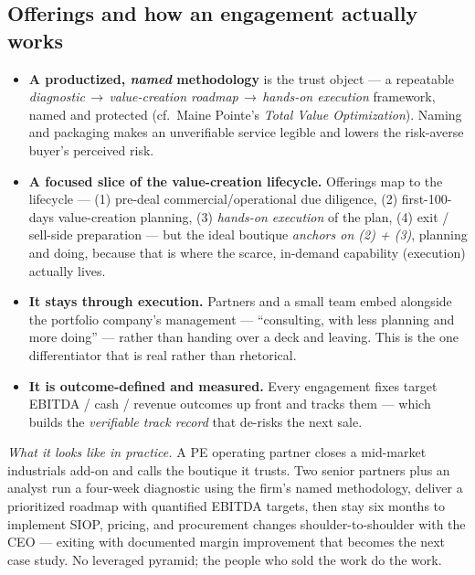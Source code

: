 \documentclass[11pt]{article}
\begin{document}
\subsection{Offerings and how an engagement actually works}
\begin{itemize}
  \item \textbf{A productized, \emph{named} methodology} is the trust object --- a
  repeatable \emph{diagnostic\,$\to$\,value-creation roadmap\,$\to$\,hands-on execution}
  framework, named and protected (cf.\ Maine Pointe's \emph{Total Value
  Optimization\texttrademark{}}). Naming and packaging makes an unverifiable service legible
  and lowers the risk-averse buyer's perceived risk.
  \item \textbf{A focused slice of the value-creation lifecycle.} Offerings map to the
  lifecycle --- (1) pre-deal commercial/operational due diligence, (2) first-100-days
  value-creation planning, (3) \emph{hands-on execution} of the plan, (4) exit / sell-side
  preparation --- but the ideal boutique \emph{anchors on (2) + (3)}, planning and doing,
  because that is where the scarce, in-demand capability (execution) actually lives.
  \item \textbf{It stays through execution.} Partners and a small team embed alongside the
  portfolio company's management --- ``consulting, with less planning and more doing'' ---
  rather than handing over a deck and leaving. This is the one differentiator that is real
  rather than rhetorical.
  \item \textbf{It is outcome-defined and measured.} Every engagement fixes target
  EBITDA / cash / revenue outcomes up front and tracks them --- which builds the
  \emph{verifiable track record} that de-risks the next sale.
\end{itemize}

\textit{What it looks like in practice.} A PE operating partner closes a mid-market
industrials add-on and calls the boutique it trusts. Two senior partners plus an analyst run
a four-week diagnostic using the firm's named methodology, deliver a prioritized roadmap
with quantified EBITDA targets, then stay six months to implement SIOP, pricing, and
procurement changes shoulder-to-shoulder with the CEO --- exiting with documented margin
improvement that becomes the next case study. No leveraged pyramid; the people who sold the
work do the work.
\end{document}
